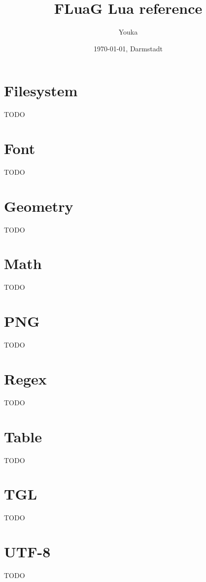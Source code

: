 \documentclass[12pt]{article}
\title{FLuaG Lua reference}
\author{Youka}
\date{\today{}, Darmstadt}
\begin{document}
\maketitle
\tableofcontents

\section{Filesystem}
\label{sec:filesystem}

TODO

\section{Font}
\label{sec:font}

TODO

\section{Geometry}
\label{sec:geometry}

TODO

\section{Math}
\label{sec:math}

TODO

\section{PNG}
\label{sec:png}

TODO

\section{Regex}
\label{sec:regex}

TODO

\section{Table}
\label{sec:table}

TODO

\section{TGL}
\label{sec:tgl}

TODO

\section{UTF-8}
\label{sec:utf8}

TODO
\end{document}

